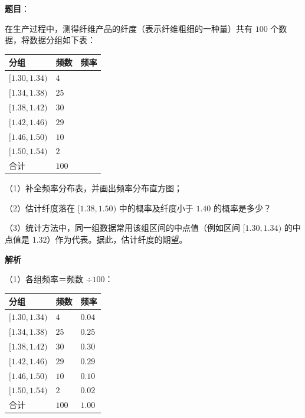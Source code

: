 \begin{answer}

\textbf{题目}：

在生产过程中，测得纤维产品的纤度（表示纤维粗细的一种量）共有 $100$ 个数据，将数据分组如下表：

\begin{center}
\begin{tabular}{lll}
\toprule
分组 & 频数 & 频率 \\
\midrule
$[1.30,1.34)$ & $4$ &  \\
$[1.34,1.38)$ & $25$ &  \\
$[1.38,1.42)$ & $30$ &  \\
$[1.42,1.46)$ & $29$ &  \\
$[1.46,1.50)$ & $10$ &  \\
$[1.50,1.54)$ & $2$ &  \\
合计 & $100$ &  \\
\bottomrule
\end{tabular}
\end{center}

（1）补全频率分布表，并画出频率分布直方图；

（2）估计纤度落在 $[1.38,1.50)$ 中的概率及纤度小于 $1.40$ 的概率是多少？

（3）统计方法中，同一组数据常用该组区间的中点值（例如区间 $[1.30,1.34)$ 的中点值是 $1.32$）作为代表。据此，估计纤度的期望。
\nopagebreak[4]
\begin{center}\end{center}
\nopagebreak[4]
\textbf{解析}

（1）各组频率＝频数 $\div100$：

\begin{center}
\begin{tabular}{lll}
\toprule
分组 & 频数 & 频率 \\
\midrule
$[1.30,1.34)$ & $4$ & $0.04$ \\
$[1.34,1.38)$ & $25$ & $0.25$ \\
$[1.38,1.42)$ & $30$ & $0.30$ \\
$[1.42,1.46)$ & $29$ & $0.29$ \\
$[1.46,1.50)$ & $10$ & $0.10$ \\
$[1.50,1.54)$ & $2$ & $0.02$ \\
合计 & $100$ & $1.00$ \\
\bottomrule
\end{tabular}
\end{center}


\end{answer}
